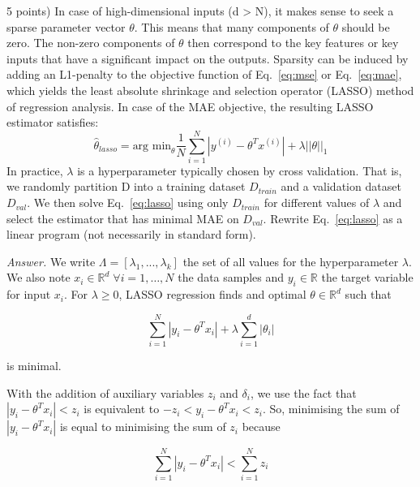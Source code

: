 \documentclass[10pt]{article}
\newenvironment{exercise}[2][Exercise]{\begin{trivlist}
  \item[\hskip \labelsep {\bfseries #1}\hskip \labelsep {\bfseries #2.}]}{\end{trivlist}}
\begin{document}
\begin{exercise}{2.1}
(5 points) In case of high-dimensional inputs (d > N), it makes sense to seek a sparse
parameter vector $\theta$. This means that many components of $\theta$ should be zero. The non-zero components of $\theta$ then correspond to the key features or key inputs that have a significant impact on the outputs. Sparsity can be induced by adding an L1-penalty to the objective function of Eq.~\ref{eq:mse} or Eq.~\ref{eq:mae}, which yields the least absolute
shrinkage and selection operator (LASSO) method of regression analysis. In case of the MAE objective, the resulting LASSO estimator satisfies:
\begin{equation}\label{eq:lasso}
    \hat\theta_{lasso} = \text{arg min}_\theta  \frac{1}{N} \sum_{i=1}^N|y^{(i)}-\theta^Tx^{(i)}| + \lambda ||\theta||_1 
\end{equation}
In practice, $\lambda$ is a hyperparameter typically chosen by cross validation. That is, we randomly partition D into a training dataset $D_{train}$
and a validation dataset $D_{val}$. We then solve Eq.~\ref{eq:lasso} using only $D_{train}$ for different
values of $\lambda$ and select the estimator that has minimal MAE on $D_{val}$. Rewrite Eq.~\ref{eq:lasso} as a linear program (not necessarily in standard form).

\textit{Answer.} 
We write $\Lambda = [\lambda_1, ... , \lambda_k]$ the set of all values for the hyperparameter $\lambda$. We also note $x_i\in \mathbb{R}^d \; \forall i=1 ,\dots, N$ the data samples and $y_i\in \mathbb{R}$ the target variable for input $x_i$. For $\lambda\geq 0$, LASSO regression finds and optimal $\theta \in \mathbb{R}^d$ such that   

\begin{equation}
 \displaystyle\sum\limits_{i=1}^{N}  |y_i-\theta^Tx_i| + \lambda\displaystyle\sum\limits_{i=1}^{d}|\theta_i|
\end{equation}

is minimal. 

With the addition of auxiliary variables $z_i$ and $\delta_i$, we use the fact that $|y_i - \theta^T x_i| < z_i$ is equivalent to $-z_i < y_i - \theta^T x_i  < z_i$. So, minimising the sum of $ |y_i-\theta^Tx_i|$ is equal to minimising the sum of $z_i$ because

\begin{equation*}
    \sum\limits_{i=1}^{N}  |y_i-\theta^Tx_i| < \sum\limits_{i=1}^{N} z_i
\end{equation*} 


\end{exercise}
\end{document}
